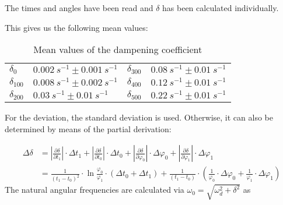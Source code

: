             The times and angles have been read and \(\delta\) has been calculated individually.\par
            This gives us the following mean values:\par
            \begin{table}[h]
                \centering
                \caption[Mean values of the dampening coefficient]{Mean values of the dampening coefficient}
                \begin{tabular}{@{}llll@{}}
                    \toprule
                    $\delta_0$        &$\SI{0.002}{s^{-1}} \pm \SI{0.001}{s^{-1}}$  &\hspace{10mm}$\delta_{300}$ &$\SI{0.08}{s^{-1}} \pm \SI{0.01}{s^{-1}}$\\
                    $\delta_{100}$    &$\SI{0.008}{s^{-1}} \pm \SI{0.002}{s^{-1}}$  &\hspace{10mm}$\delta_{400}$ &$\SI{0.12}{s^{-1}} \pm \SI{0.01}{s^{-1}}$\\
                    $\delta_{200}$    &$\SI{0.03}{s^{-1}} \pm \SI{0.01}{s^{-1}}$    &\hspace{10mm}$\delta_{500}$ &$\SI{0.22}{s^{-1}} \pm \SI{0.01}{s^{-1}}$\\
                    \bottomrule
                \end{tabular}
                \label{tab:dampening_coefficients}
            \end{table}
            For the deviation, the standard deviation is used. Otherwise, it can also be determined by means of the partial derivation:\par
            \begin{align}
                \Delta\delta    &= \left| \frac{\partial\delta}{\partial t_1} \right| \cdot \Delta t_1 + \left| \frac{\partial\delta}{\partial t_0} \right| \cdot \Delta t_0 + \left| \frac{\partial\delta}{\partial \varphi_0} \right| \cdot \Delta \varphi_0 + \left| \frac{\partial\delta}{\partial \varphi_1} \right| \cdot \Delta \varphi_1 \nonumber\\
                                &= \frac{1}{(t_1-t_0)^2} \cdot \ln{\frac{\varphi_0}{\varphi_1}} \cdot (\Delta t_0 + \Delta t_1) + \frac{1}{(t_1-t_0)} \cdot \left( \frac{1}{\varphi_0} \cdot \Delta\varphi_0 + \frac{1}{\varphi_1} \cdot \Delta\varphi_1 \right)
            \end{align}%
            The natural angular frequencies are calculated via $ \omega_0=\sqrt{\omega_d^2+\delta^2} $ as\par
